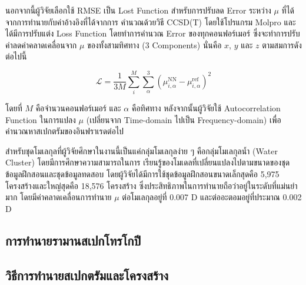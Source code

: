 นอกจากนี้ผู้วิจัยเลือกใช้ RMSE เป็น Lost Function สำหรับการปรับลด Error ระหว่าง $\mu$ ที่ได้จากการทำนายกับค่าอ้างอิงที่ได้จากการ%
คำนวณด้วยวิธี CCSD(T) โดยใช้โปรแกรม Molpro และได้มีการปรับแต่ง Loss Function โดยทำการคำนวณ Error ของทุกคอนฟอร์เมอร์ 
ซึ่งจะทำการปรับค่าลดค่าคลาดเคลื่อนจาก $\mu$ ของทั้งสามทิศทาง (3 Components) นั่นคือ $x$, $y$ และ $z$ ตามสมการดังต่อไปนี้

\begin{equation}
    \mathcal{L} = \frac{1}{3M} \sum^{M}_{i} \sum^{3}_{\alpha} (\mu^{\text{NN}}_{i,\alpha} 
    - \mu^{\text{ref}}_{i,\alpha})^{2}
\end{equation}

\noindent โดยที่ $M$ คือจำนวนคอนฟอร์เมอร์ และ $\alpha$ คือทิศทาง หลังจากนั้นผู้วิจัยใช้ Autocorrelation Function ในการแปลง 
$\mu$ (เปลี่ยนจาก Time-domain ไปเป็น Frequency-domain) เพื่อคำนวณหาสเปกตรัมของอินฟราเรดต่อไป 

สำหรับชุดโมเลกุลที่ผู้วิจัยศึกษาในงานนี้เป็นแค่กลุ่มโมเลกุลง่าย ๆ คือกลุ่มโมเลกุลน้ำ (Water Cluster) โดยมีการศึกษาความสามารถในการ%
เรียนรู้ของโมเดลที่เปลี่ยนแปลงไปตามขนาดของชุดข้อมูลฝึกสอนและชุดข้อมูลทดสอบ โดยผู้วิจัยได้มีการใช้ชุดข้อมูลฝึกสอนขนาดเล็กสุดคือ 5,975 
โครงสร้างและใหญ่สุดคือ 18,576 โครงสร้าง ซึ่งประสิทธิภาพในการทำนายถือว่าอยู่ในระดับที่แม่นยำมาก โดยมีค่าคลาดเคลื่อนการทำนาย $\mu$ 
ต่อโมเลกุลอยู่ที่ 0.007 D และต่ออะตอมอยู่ที่ประมาณ 0.002 D

\subsection{การทำนายรามานสเปกโทรโกปี}
\label{ssec:pred_spec_raman}


\subsection{วิธีการทำนายสเปกตรัมและโครงสร้าง}
\label{ssec:pred_spec_struct}

